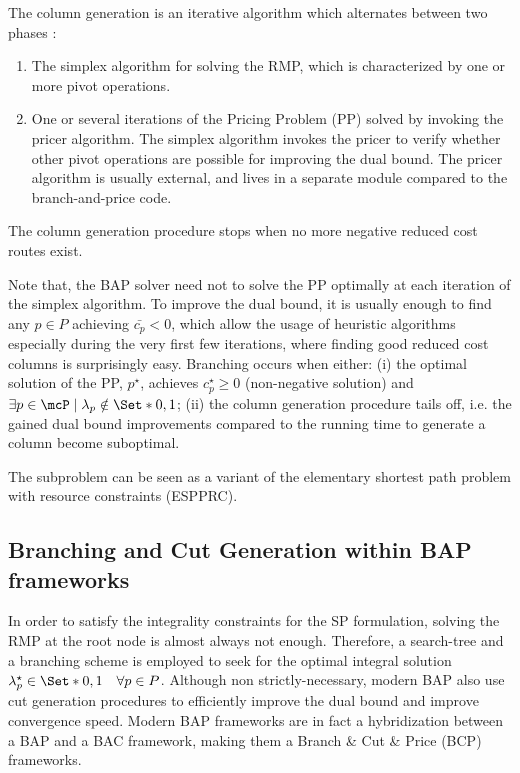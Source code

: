 The column generation is an iterative algorithm which alternates between two phases \parencite{desaulniers2018}:
\begin{enumerate}
	\item The simplex algorithm for solving the RMP, which is characterized by one or more pivot operations.
	\item One or several iterations of the Pricing Problem (PP) solved by invoking the pricer algorithm.
	      The simplex algorithm invokes the pricer to verify whether other pivot operations are possible for improving the dual bound.
	      The pricer algorithm is usually external, and lives in a separate module compared to the branch-and-price code.
\end{enumerate}

The column generation procedure stops when no more negative reduced cost routes exist.

Note that, the BAP solver need not to solve the PP optimally at each iteration of the simplex algorithm.
To improve the dual bound, it is usually enough to find any $p \in P$ achieving $\bar{c_p} < 0$, which allow the usage of heuristic algorithms especially during the very first few iterations, where finding good reduced cost columns is surprisingly easy.
Branching occurs when either: (i) the optimal solution of the PP, $p^\star$, achieves $c^\star_p \ge 0$ (non-negative solution) and $\exists p \in \mcP \mid \lambda_p \notin \Set*{0, 1}$; (ii) the column generation procedure tails off, i.e. the gained dual bound improvements compared to the running time to generate a column become suboptimal.

The subproblem can be seen as a variant of the elementary shortest path problem with resource constraints (ESPPRC).


\subsection{Branching and Cut Generation within BAP frameworks}
\label{sec:intro-branching-and-cut-generation-within-bap-frameworks}

In order to satisfy the integrality constraints for the SP formulation, solving the RMP at the root node
is almost always not enough.
Therefore, a search-tree and a branching scheme is employed to seek for the optimal integral solution $\lambda^\star_p \in \Set*{0, 1} \quad \forall p \in P$.
Although non strictly-necessary, modern BAP also use cut generation procedures to efficiently improve the dual bound and improve convergence speed.
Modern BAP frameworks are in fact a hybridization between a BAP and a BAC framework, making them a Branch \& Cut \& Price (BCP) frameworks.

